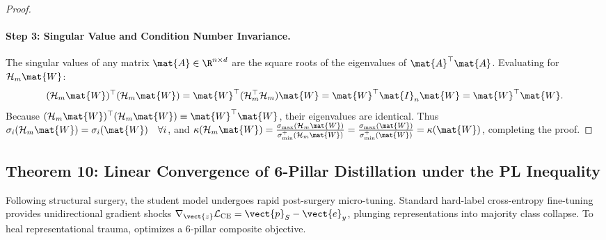 \begin{proof}
\paragraph{Step 3: Singular Value and Condition Number Invariance.}
The singular values of any matrix $\mat{A} \in \R^{n \times d}$ are the square roots of the eigenvalues of $\mat{A}^\top \mat{A}$. Evaluating for $\mathcal{H}_m \mat{W}$:
\begin{equation}
(\mathcal{H}_m \mat{W})^\top (\mathcal{H}_m \mat{W}) = \mat{W}^\top (\mathcal{H}_m^\top \mathcal{H}_m) \mat{W} = \mat{W}^\top \mat{I}_n \mat{W} = \mat{W}^\top \mat{W}.
\end{equation}
Because $(\mathcal{H}_m \mat{W})^\top (\mathcal{H}_m \mat{W}) \equiv \mat{W}^\top \mat{W}$, their eigenvalues are identical. Thus $\sigma_i(\mathcal{H}_m \mat{W}) = \sigma_i(\mat{W}) \quad \forall i$, and $\kappa(\mathcal{H}_m \mat{W}) = \frac{\sigma_{\max}(\mathcal{H}_m \mat{W})}{\sigma_{\min}^+(\mathcal{H}_m \mat{W})} = \frac{\sigma_{\max}(\mat{W})}{\sigma_{\min}^+(\mat{W})} = \kappa(\mat{W})$, completing the proof.
\end{proof}

\subsection{Theorem 10: Linear Convergence of 6-Pillar Distillation under the PL Inequality}
\label{sec:thm_distillation_convergence}

Following structural surgery, the student model undergoes rapid post-surgery micro-tuning. Standard hard-label cross-entropy fine-tuning provides unidirectional gradient shocks $\nabla_{\vect{z}} \mathcal{L}_{\text{CE}} = \vect{p}_S - \vect{e}_y$, plunging representations into majority class collapse. To heal representational trauma, \neuralops{} optimizes a 6-pillar composite objective.

